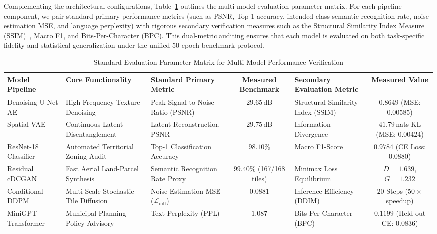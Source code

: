 \documentclass[conference]{IEEEtran}
\begin{document}
Complementing the architectural configurations, Table~\ref{tab:eval_matrix} outlines the multi-model evaluation parameter matrix. For each pipeline component, we pair standard primary performance metrics (such as PSNR, Top-1 accuracy, intended-class semantic recognition rate, noise estimation MSE, and language perplexity) with rigorous secondary verification measures such as the Structural Similarity Index Measure (SSIM)~\cite{wang2004image}, Macro F1, and Bits-Per-Character (BPC). This dual-metric auditing ensures that each model is evaluated on both task-specific fidelity and statistical generalization under the unified 50-epoch benchmark protocol.

\begin{table}[!t]
\caption{Standard Evaluation Parameter Matrix for Multi-Model Performance Verification}
\centering
\scriptsize
\setlength{\tabcolsep}{3.5pt}
\begin{tabularx}{\textwidth}{@{}l X l c X c@{}}
\toprule
\textbf{Model Pipeline} & \textbf{Core Functionality} & \textbf{Standard Primary Metric} & \textbf{Measured Benchmark} & \textbf{Secondary Evaluation Metric} & \textbf{Measured Value} \\
\midrule
Denoising U-Net AE & High-Frequency Texture Denoising & Peak Signal-to-Noise Ratio (PSNR) & $\mathbf{29.65}$\,dB & Structural Similarity Index (SSIM) & $\mathbf{0.8649}$ (MSE: $0.00585$) \\
Spatial VAE & Continuous Latent Disentanglement & Latent Reconstruction PSNR & $\mathbf{29.75}$\,dB & Information Divergence & $41.79$\,nats KL (MSE: $0.00424$) \\
ResNet-18 Classifier & Automated Territorial Zoning Audit & Top-1 Classification Accuracy & $\mathbf{98.10\%}$ & Macro F1-Score & $\mathbf{0.9784}$ (CE Loss: $0.0880$) \\
Residual cDCGAN & Fast Aerial Land-Parcel Synthesis & Semantic Recognition Rate Proxy & $\mathbf{99.40\%}$ (167/168 tiles) & Minimax Loss Equilibrium & $D=1.639$, $G=1.232$ \\
Conditional DDPM & Multi-Scale Stochastic Tile Diffusion & Noise Estimation MSE ($\mathcal{L}_{\text{diff}}$) & $\mathbf{0.0881}$ & Inference Efficiency (DDIM) & $20$ Steps ($50\times$ speedup) \\
MiniGPT Transformer & Municipal Planning Policy Advisory & Text Perplexity (PPL) & $\mathbf{1.087}$ & Bits-Per-Character (BPC) & $\mathbf{0.1199}$ (Held-out CE: $0.0836$) \\
\bottomrule
\end{tabularx}
\label{tab:eval_matrix}
\end{table}
\end{document}
